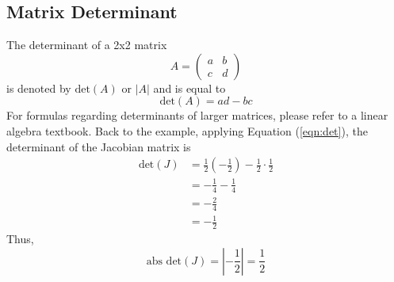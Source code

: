 \subsection{Matrix Determinant}

The determinant of a 2x2 matrix
\begin{equation*}
    A = 
    \begin{pmatrix}
        a & b \\ 
        c & d
    \end{pmatrix}
\end{equation*}
is denoted by $\text{det}(A)$ or $|A|$ and is equal to 
\begin{equation} \label{eqn:det}
        \text{det}(A) = ad - bc
\end{equation}
For formulas regarding determinants of larger matrices, please refer to a linear algebra 
textbook. Back to the example, applying Equation (\ref{eqn:det}), the determinant of the Jacobian matrix 
is 
\begin{equation*}
    \begin{aligned}
        \text{det}(J) & = \frac{1}{2} (-\frac{1}{2}) - \frac{1}{2} \cdot \frac{1}{2} \\ 
        & = -\frac{1}{4} - \frac{1}{4} \\ 
        & = -\frac{2}{4} \\ 
        & = -\frac{1}{2}
    \end{aligned}
\end{equation*}
Thus, 
\begin{equation*}
    \text{abs det}(J) = \left|- \frac{1}{2}\right| = \frac{1}{2}
\end{equation*}